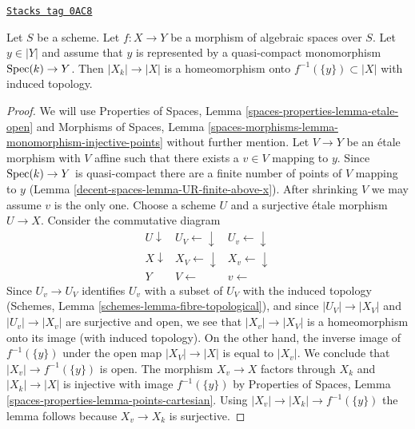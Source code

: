 \begin{lemma}
\label{decent-spaces-lemma-topology-fibre}
\href{https://stacks.math.columbia.edu/tag/0AC8}{\texttt{Stacks tag 0AC8}}


Let $S$ be a scheme. Let $f : X \to Y$ be a morphism of algebraic spaces
over $S$.
Let $y \in |Y|$ and assume that $y$ is represented by a quasi-compact
monomorphism $\operatorname{Spec}(k) \to Y$. Then $|X_k| \to |X|$ is a
homeomorphism onto $f^{-1}(\{y\}) \subset |X|$ with induced topology.
\end{lemma}

\begin{proof}
We will use
Properties of Spaces, Lemma \ref{spaces-properties-lemma-etale-open}
and
Morphisms of Spaces, Lemma
\ref{spaces-morphisms-lemma-monomorphism-injective-points}
without further mention.
Let $V \to Y$ be an \'etale morphism with $V$ affine such that there
exists a $v \in V$ mapping to $y$. Since $\operatorname{Spec}(k) \to Y$ is quasi-compact
there are a finite number of points of $V$ mapping to $y$
(Lemma \ref{decent-spaces-lemma-UR-finite-above-x}). After shrinking
$V$ we may assume $v$ is the only one. Choose a scheme $U$ and
a surjective \'etale morphism $U \to X$.
Consider the commutative diagram
$$
\begin{array}{ccc}U \downarrow & U_V \longleftarrow\downarrow & U_v \longleftarrow\downarrow \\ X \downarrow & X_V \longleftarrow\downarrow & X_v \longleftarrow\downarrow \\ Y & V \longleftarrow & v \longleftarrow\end{array}
$$
Since $U_v \to U_V$ identifies $U_v$ with a subset of $U_V$ with
the induced topology (Schemes, Lemma \ref{schemes-lemma-fibre-topological}),
and since $|U_V| \to |X_V|$ and $|U_v| \to |X_v|$ are surjective and open,
we see that $|X_v| \to |X_V|$ is a homeomorphism onto its image (with
induced topology).
On the other hand, the inverse image of $f^{-1}(\{y\})$
under the open map $|X_V| \to |X|$ is equal to $|X_v|$.
We conclude that $|X_v| \to f^{-1}(\{y\})$ is open.
The morphism $X_v \to X$ factors through $X_k$
and $|X_k| \to |X|$ is injective with image $f^{-1}(\{y\})$
by Properties of Spaces, Lemma
\ref{spaces-properties-lemma-points-cartesian}. Using
$|X_v| \to |X_k| \to f^{-1}(\{y\})$ the lemma follows because
$X_v \to X_k$ is surjective.
\end{proof}


